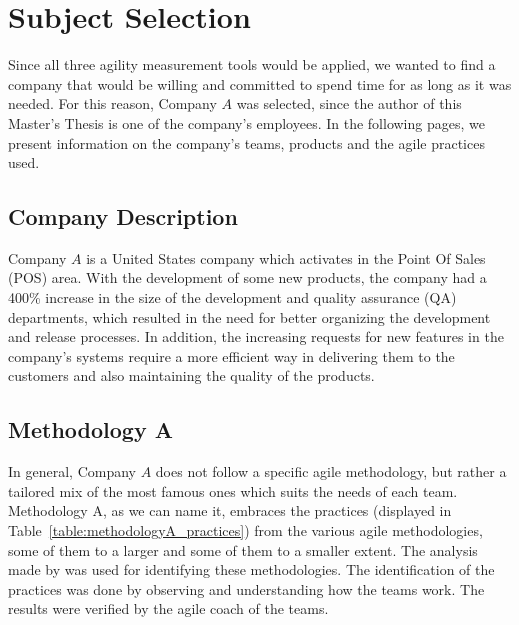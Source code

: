 \section{Subject Selection}
Since all three agility measurement tools would be applied, we wanted to find a company that would be willing and committed to spend time for as long as it was needed. For this reason, Company $A$ was selected, since the author of this Master's Thesis is one of the company's employees. In the following pages, we present information on the company's teams, products and the agile practices used.

\subsection{Company Description}
Company $A$ is a United States company which activates in the Point Of Sales (POS) area. With the development of some new products, the company had a 400\% increase in the size of the development and quality assurance (QA) departments, which resulted in the need for better organizing the development and release processes. In addition, the increasing requests for new features in the company's systems require a more efficient way in delivering them to the customers and also maintaining the quality of the products.

\subsection{Methodology A}
In general, Company $A$ does not follow a specific agile methodology, but rather a tailored mix of the most famous ones which suits the needs of each team. Methodology A, as we can name it, embraces the practices (displayed in Table~\ref{table:methodologyA_practices}) from the various agile methodologies, some of them to a larger and some of them to a smaller extent. The analysis made by \citet{koch2005agile} was used for identifying these methodologies. The identification of the practices was done by observing and understanding how the teams work. The results were verified by the agile coach of the teams.

